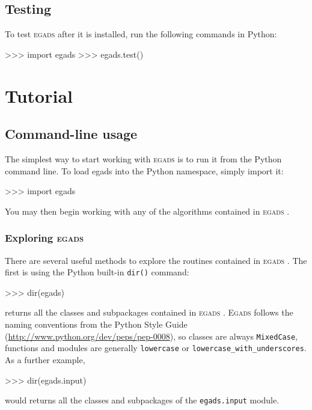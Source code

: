 \documentclass[a4paper,11pt]{report}
\newcommand{\egads}{\textsc{egads} }
\newcommand{\Egads}{\textsc{Egads} }
\begin{document}
\section{Testing}

To test \egads after it is installed, run the following commands in Python:

\begin{command}
   >>> import egads
   >>> egads.test()
\end{command} 

\chapter{Tutorial}

\section{Command-line usage}
The simplest way to start working with \egads is to run it from the Python command line. 
To load egads into the Python namespace, simply import it:

\begin{command}
    >>> import egads
\end{command}
You may then begin working with any of the algorithms contained in \egads.

\subsection{Exploring \egads}
There are several useful methods to explore the routines contained in \egads. 
The first is using the Python built-in \verb|dir()| command:

\begin{command}
    >>> dir(egads)
\end{command}
returns all the classes and subpackages contained in \egads. \Egads follows the 
naming conventions from the Python Style Guide (\href{http://www.python.org/dev/peps/pep-0008}{http://www.python.org/dev/peps/pep-0008}), 
so classes are always \verb|MixedCase|, functions and modules are 
generally \verb|lowercase| or \verb|lowercase_with_underscores|. As a further example,

\begin{command}
    >>> dir(egads.input)
\end{command}
would returns all the classes and subpackages of the \verb|egads.input| module.
\end{document}
